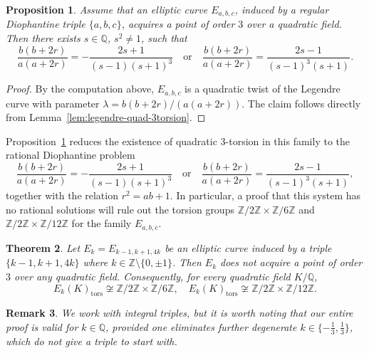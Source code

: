 \documentclass{article}
\theoremstyle{plain}
\newtheorem{theorem}{Theorem}
\newtheorem{proposition}[theorem]{Proposition}
\newtheorem{remark}[theorem]{Remark}
\newcommand{\Z}{\mathbb{Z}}
\newcommand{\Q}{\mathbb{Q}}
\newcommand{\tors}{\mathrm{tors}}
\begin{document}
\begin{proposition}\label{prop:lambda-parametrization}
Assume that an elliptic curve \(E_{a,b,c}\), induced by a regular Diophantine triple \(\{ a, b, c\}\),  acquires a point of order \(3\) over a quadratic
field. Then there exists \(s\in \Q\), \(s^2\neq 1\), such that
\[
\frac{b(b+2r)}{a(a+2r)}
=
-\frac{2s+1}{(s-1)(s+1)^3}
\quad\text{or}\quad
\frac{b(b+2r)}{a(a+2r)}
=
\frac{2s-1}{(s-1)^3(s+1)}.
\]
\end{proposition}

\begin{proof}
By the computation above, \(E_{a,b,c}\) is a quadratic twist of the Legendre
curve with parameter \(\lambda=b(b+2r)/(a(a+2r))\). The claim follows directly
from Lemma~\ref{lem:legendre-quad-3torsion}.
\end{proof}

Proposition~\ref{prop:lambda-parametrization} reduces the existence of
quadratic \(3\)-torsion in this family to the rational Diophantine problem
\[
\frac{b(b+2r)}{a(a+2r)}
=
-\frac{2s+1}{(s-1)(s+1)^3}
\quad\text{or}\quad
\frac{b(b+2r)}{a(a+2r)}
=
\frac{2s-1}{(s-1)^3(s+1)},
\]
together with the relation \(r^2=ab+1\). In particular, a proof that this
system has no rational solutions will rule out the torsion groups
\(\Z/2\Z\times \Z/6\Z\) and \(\Z/2\Z\times \Z/12\Z\) for the family
\(E_{a,b,c}\).

\begin{theorem}
Let \( E_k=E_{k-1,k+1,4k}\) be an elliptic curve induced by a triple $\{k-1, k+1, 4k\}$ where $k\in \Z\setminus\{0,\pm1\} $. Then \(E_k\) does not acquire a point of order \(3\) over any quadratic field. Consequently, for every quadratic field \(K/\Q\),
\[
E_k(K)_{\tors}
\not\cong \Z/2\Z\times\Z/6\Z,
\quad
E_k(K)_{\tors}
\not\cong \Z/2\Z\times\Z/12\Z.
\]
\end{theorem}
\begin{remark}
    We work with integral triples, but it is worth noting that our entire proof is valid for $k\in\Q$, provided one eliminates further degenerate $k\in\{ -\frac 13, \frac 13\}$, which do not give a triple to start with.
\end{remark}
\end{document}
